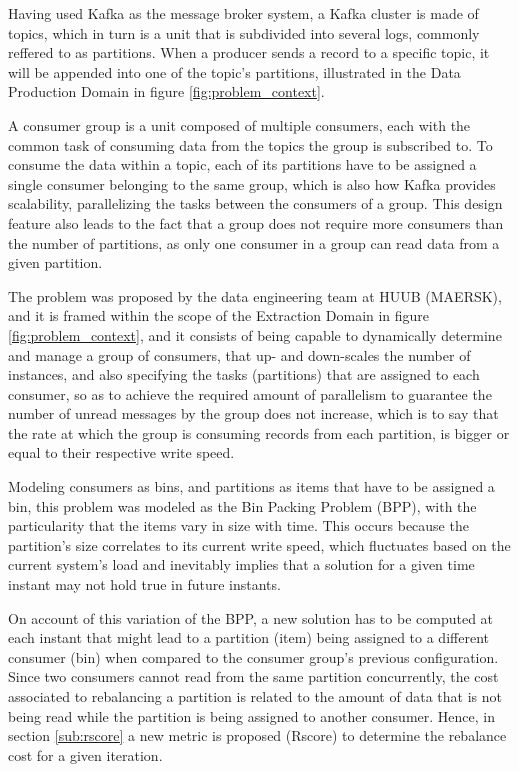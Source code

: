 Having used Kafka as the message broker system, a Kafka cluster is made of
topics, which in turn is a unit that is subdivided into several logs, commonly
reffered to as partitions. When a producer sends a record to a specific topic,
it will be appended into one of the topic's partitions, illustrated in the
Data Production Domain in figure \ref{fig:problem_context}. 

A consumer group is a unit composed of multiple consumers, each with the common
task of consuming data from the topics the group is subscribed to. To consume
the data within a topic, each of its partitions have to be assigned a single
consumer belonging to the same group, which is also how Kafka provides
scalability, parallelizing the tasks between the consumers of a group. This
design feature also leads to the fact that a group does not require more
consumers than the number of partitions, as only one consumer in a group can
read data from a given partition.

The problem was proposed by the data engineering team at HUUB (MAERSK), and it
is framed within the scope of the Extraction Domain in figure
\ref{fig:problem_context}, and it consists of being capable to dynamically
determine and manage a group of consumers, that up- and down-scales the
number of instances, and also specifying the tasks (partitions) that are assigned
to each consumer, so as to achieve the required amount of parallelism to
guarantee the number of unread messages by the group does not increase, which is
to say that the rate at which the group is consuming records from each
partition, is bigger or equal to their respective write speed.

Modeling consumers as bins, and partitions as items that have to be assigned a
bin, this problem was modeled as the Bin Packing Problem (BPP), with the
particularity that the items vary in size with time. This occurs because the
partition's size correlates to its current write speed, which fluctuates based
on the current system's load and inevitably implies that a solution for a given
time instant may not hold true in future instants. 

On account of this variation of the BPP, a new solution has to be computed at
each instant that might lead to a partition (item) being assigned to a different
consumer (bin) when compared to the consumer group's previous configuration.
Since two consumers cannot read from the same partition concurrently, the cost
associated to rebalancing a partition is related to the amount of data that is
not being read while the partition is being assigned to another consumer. Hence,
in section \ref{sub:rscore} a new metric is proposed (Rscore) to determine the rebalance
cost for a given iteration. 

